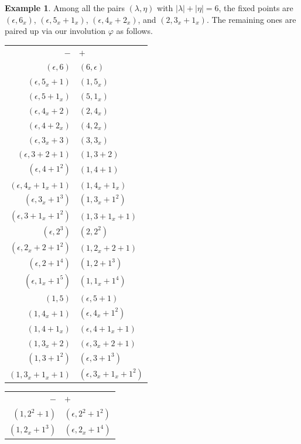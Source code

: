 \documentclass[11pt,reqno]{amsart}
\numberwithin{equation}{section}
\theoremstyle{plain}
\theoremstyle{definition}
\newtheorem{example}[theorem]{Example}
\theoremstyle{named}
\def\la{\lambda}
\begin{document}
\begin{example}
Among all the pairs $(\la,\eta)$ with $|\la|+|\eta|=6$, the fixed points are $(\epsilon, 6_{x})$, $(\epsilon, 5_x+1_x)$, $(\epsilon, 4_x+2_x)$, and $(2, 3_x+1_x)$. The remaining ones are paired up via our involution $\varphi$ as follows.
\medskip
\begin{minipage}[c]{0.5\textwidth}
\centering
\begin{tabular}{r|l}
$-$ & $+$\\
$(\epsilon, 6)$ & $(6, \epsilon)$\\
$(\epsilon, 5_x+1)$ & $(1, 5_{x})$\\
$(\epsilon, 5+1_{x})$ & $(5, 1_{x})$\\
$(\epsilon, 4_x+2)$ & $(2, 4_x)$\\
$(\epsilon, 4+2_x)$ & $(4, 2_x)$\\
$(\epsilon, 3_x+3)$ & $(3, 3_x)$\\
$(\epsilon, 3+2+1)$ & $(1, 3+2)$\\
$(\epsilon, 4+1^2)$ & $(1, 4+1)$\\
$(\epsilon, 4_x+1_x+1)$ & $(1, 4_x+1_x)$\\
$(\epsilon, 3_x+1^3)$ & $(1, 3_x+1^2)$\\
$(\epsilon, 3+1_x+1^2)$ & $(1, 3+1_x+1)$\\
$(\epsilon, 2^3)$ & $(2, 2^2)$\\
$(\epsilon, 2_x+2+1^2)$ & $(1, 2_x+2+1)$\\
$(\epsilon, 2+1^4)$ & $(1, 2+1^3)$\\
$(\epsilon, 1_x+1^5)$ & $(1, 1_x+1^4)$\\
$(1, 5)$ & $(\epsilon, 5+1)$\\
$(1, 4_x+1)$ & $(\epsilon, 4_x+1^2)$\\
$(1, 4+1_x)$ & $(\epsilon, 4+1_x+1)$\\
$(1, 3_x+2)$ & $(\epsilon, 3_x+2+1)$\\
$(1, 3+1^2)$ & $(\epsilon, 3+1^3)$\\
$(1, 3_x+1_x+1)$ & $(\epsilon, 3_x+1_x+1^2)$\\
\end{tabular}
\end{minipage}
\begin{minipage}[c]{0.5\textwidth}
\centering
\begin{tabular}{r|l}
$-$ & $+$\\
$(1, 2^2+1)$ & $(\epsilon, 2^2+1^2)$\\
$(1, 2_x+1^3)$ & $(\epsilon, 2_x+1^4)$\\

\end{tabular}
\end{minipage}
\end{example}
\end{document}
